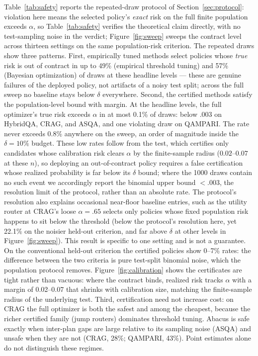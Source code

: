 Table~\ref{tab:safety} reports the repeated-draw protocol of
Section~\ref{sec:protocol}: violation here means the selected policy's
\emph{exact} risk on the full finite population exceeds $\alpha$, so
Table~\ref{tab:safety} verifies the theoretical claim directly, with
no test-sampling noise in the verdict; Figure~\ref{fig:sweep} sweeps
the contract level across thirteen settings on the same
population-risk criterion. The repeated draws show three patterns.
First,
empirically tuned methods select policies whose \emph{true} risk is
out of contract in up to 49\% (empirical threshold tuning) and 57\%
(Bayesian optimization) of draws at these headline levels ---
these are genuine failures of the deployed policy, not artifacts of a
noisy test split; across the full sweep no baseline stays below
$\delta$ everywhere. Second, the certified methods satisfy the
population-level bound with margin. At the headline levels, the full
optimizer's true risk exceeds $\alpha$ in at most 0.1\% of draws: below
$.003$ on HybridQA, CRAG, and ASQA, and one violating draw on QAMPARI.
The rate never exceeds 0.8\% anywhere on the sweep, an order of
magnitude inside the $\delta = 10\%$ budget. These low rates follow from the test,
which certifies only
candidates whose calibration risk clears $\alpha$ by the
finite-sample radius ($0.02$--$0.07$ at these $n$), so deploying an
out-of-contract policy requires a false certification whose realized
probability is far below its $\delta$ bound; where the 1000 draws
contain no such event we accordingly report the binomial upper bound
$<.003$, the resolution limit of the protocol, rather than an
absolute rate. The protocol's resolution also explains occasional
near-floor baseline entries, such as the utility router at
CRAG's loose $\alpha = .65$ selects only policies whose fixed
population risk happens to sit below the threshold (below the
protocol's resolution here, yet
22.1\% on the noisier held-out criterion, and far above $\delta$ at
other levels in Figure~\ref{fig:sweep}). This result is specific to one
setting and is not a guarantee. On the
conventional held-out criterion the certified policies show 0--7\%
rates:
the difference between the two criteria is pure test-split binomial
noise, which the population protocol removes.
Figure~\ref{fig:calibration} shows the certificates are tight rather
than vacuous: where the contract binds, realized risk tracks $\alpha$
with a margin of 0.02--0.07 that shrinks with calibration size, matching
the finite-sample radius of the underlying test. Third, certification
need not increase cost: on CRAG the full optimizer is both the safest and
among the cheapest, because the richer certified family (jump routers)
dominates threshold tuning. Abacus is safe exactly when inter-plan gaps
are large relative to its sampling noise (ASQA) and unsafe when they
are not (CRAG, 28\%; QAMPARI, 43\%). Point estimates alone do not
distinguish these regimes.

